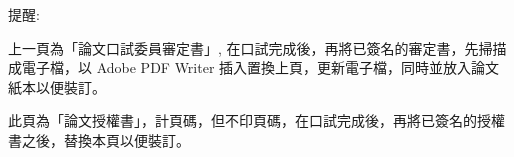 %
\newpage%


提醒:

上一頁為「論文口試委員審定書」, 在口試完成後，再將已簽名的審定書，先掃描成電子檔，以 Adobe PDF Writer 插入置換上頁，更新電子檔，同時並放入論文紙本以便裝訂。

\vspace{2cm}

此頁為「論文授權書」，計頁碼，但不印頁碼，在口試完成後，再將已簽名的授權書之後，替換本頁以便裝訂。
{\thispagestyle{empty}%
\mbox{}\clearpage}

%
\newpage
\thispagestyle{plain}  %

\begin{center}
\renewcommand{\baselinestretch}{1}   %
%
%
{}\\
\end{center}
\renewcommand{\baselinestretch}{\mybaselinestretch}   %
\normalsize

\newpage

